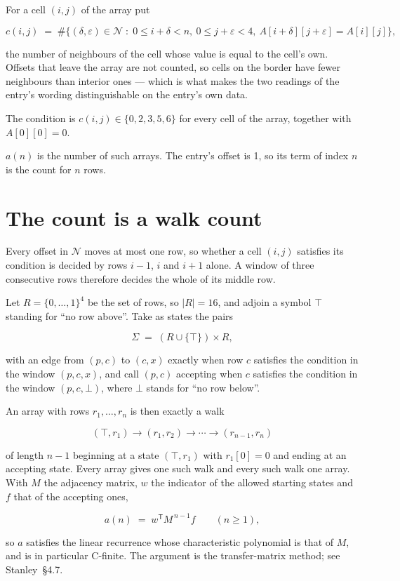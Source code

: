 \documentclass[11pt]{article}
\theoremstyle{definition}
\begin{document}
For a cell $(i,j)$ of the array put

\[c(i,j) \;=\; \#\bigl\{(\delta,\varepsilon)\in\mathcal{N} \;:\; 0\le i+\delta<n,\ 0\le j+\varepsilon<4,\ A[i+\delta][j+\varepsilon] = A[i][j]\bigr\},\]

the number of neighbours of the cell whose value is equal to the cell's own. Offsets that leave the array are not counted, so cells on the border have fewer neighbours than interior ones --- which is what makes the two readings of the entry's wording distinguishable on the entry's own data.

The condition is $c(i,j) \in \{0, 2, 3, 5, 6\}$ for every cell of the array, together with $A[0][0]=0$.

$a(n)$ is the number of such arrays. The entry's offset is 1, so its term of index $n$ is the count for $n$ rows.

\section{The count is a walk count}

Every offset in $\mathcal{N}$ moves at most one row, so whether a cell $(i,j)$ satisfies its condition is decided by rows $i-1$, $i$ and $i+1$ alone. A window of three consecutive rows therefore decides the whole of its middle row.

Let $R = \{0,\dots,1\}^{4}$ be the set of rows, so $|R| = 16$, and adjoin a symbol $\top$ standing for ``no row above''. Take as states the pairs

\[\Sigma \;=\; (R \cup \{\top\}) \times R,\]

with an edge from $(p,c)$ to $(c,x)$ exactly when row $c$ satisfies the condition in the window $(p,c,x)$, and call $(p,c)$ accepting when $c$ satisfies the condition in the window $(p,c,\bot)$, where $\bot$ stands for ``no row below''.

An array with rows $r_1,\dots,r_n$ is then exactly a walk

\[(\top,r_1) \to (r_1,r_2) \to \cdots \to (r_{n-1},r_n)\]

of length $n-1$ beginning at a state $(\top,r_1)$ with $r_1[0]=0$ and ending at an accepting state. Every array gives one such walk and every such walk one array. With $M$ the adjacency matrix, $w$ the indicator of the allowed starting states and $f$ that of the accepting ones,

\[a(n) \;=\; w^{\mathsf T} M^{\,n-1} f \qquad (n \ge 1),\]

so $a$ satisfies the linear recurrence whose characteristic polynomial is that of $M$, and is in particular C-finite. The argument is the transfer-matrix method; see Stanley~\S4.7.
\end{document}
